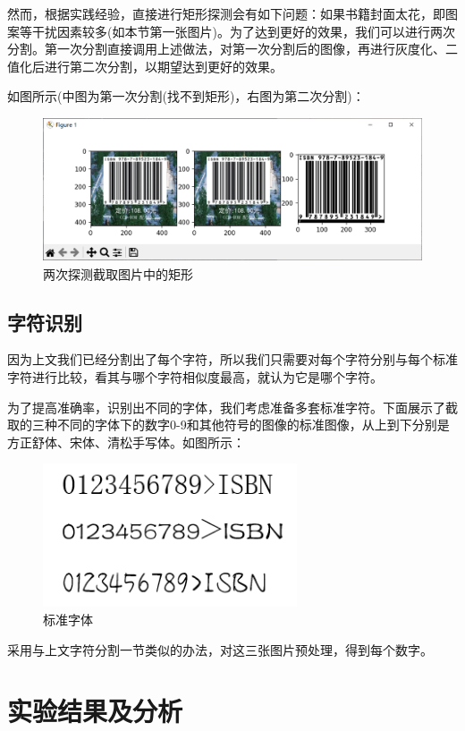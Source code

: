 \documentclass{ctexart}
\begin{document}
然而，根据实践经验，直接进行矩形探测会有如下问题：如果书籍封面太花，即图案等干扰因素较多(如本节第一张图片)。为了达到更好的效果，我们可以进行两次分割。第一次分割直接调用上述做法，对第一次分割后的图像，再进行灰度化、二值化后进行第二次分割，以期望达到更好的效果。

如图所示(中图为第一次分割(找不到矩形)，右图为第二次分割)：

\begin{figure}[H]
    \centering
    \includegraphics[height=120pt]{sample_graphSplit2}
    \caption{两次探测截取图片中的矩形}
\end{figure}


\subsection{字符识别}

因为上文我们已经分割出了每个字符，所以我们只需要对每个字符分别与每个标准字符进行比较，看其与哪个字符相似度最高，就认为它是哪个字符。

为了提高准确率，识别出不同的字体，我们考虑准备多套标准字符。下面展示了截取的三种不同的字体下的数字0-9和其他符号的图像的标准图像，从上到下分别是方正舒体、宋体、清松手写体。如图所示：

\begin{figure}[H]
    \centering
    \includegraphics[height=120pt]{standard_fonts}
    \caption{标准字体}
\end{figure}

采用与上文字符分割一节类似的办法，对这三张图片预处理，得到每个数字。

\section{实验结果及分析}
\end{document}
